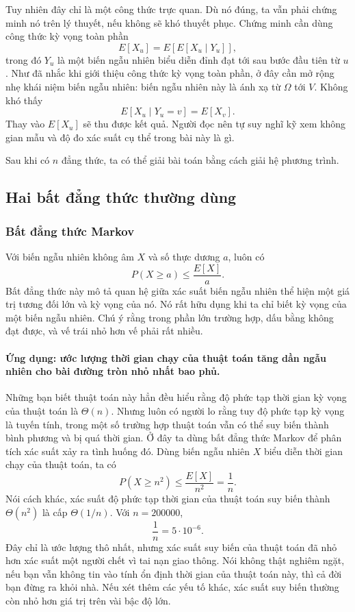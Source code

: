 \documentclass[11pt]{article}
\begin{document}
Tuy nhiên đây chỉ là một công thức trực quan. Dù nó đúng, ta vẫn phải chứng
minh nó trên lý thuyết, nếu không sẽ khó thuyết phục. Chứng minh cần dùng
công thức kỳ vọng toàn phần
\[
  E[X_u]=E[E[X_u\mid Y_u]],
\]
trong đó \(Y_u\) là một biến ngẫu nhiên biểu diễn đỉnh đạt tới sau bước đầu
tiên từ \(u\). Như đã nhắc khi giới thiệu công thức kỳ vọng toàn phần, ở đây
cần mở rộng nhẹ khái niệm biến ngẫu nhiên: biến ngẫu nhiên này là ánh xạ từ
\(\Omega\) tới \(V\). Không khó thấy
\[
  E[X_u\mid Y_u=v]=E[X_v].
\]
Thay vào \(E[X_u]\) sẽ thu được kết quả. Người đọc nên tự suy nghĩ kỹ xem
không gian mẫu và độ đo xác suất cụ thể trong bài này là gì.

Sau khi có \(n\) đẳng thức, ta có thể giải bài toán bằng cách giải hệ phương
trình.

\subsection{Hai bất đẳng thức thường dùng}

\subsubsection{Bất đẳng thức Markov}

Với biến ngẫu nhiên không âm \(X\) và số thực dương \(a\), luôn có
\[
  P(X\ge a)\le \frac{E[X]}{a}.
\]
Bất đẳng thức này mô tả quan hệ giữa xác suất biến ngẫu nhiên thể hiện một
giá trị tương đối lớn và kỳ vọng của nó. Nó rất hữu dụng khi ta chỉ biết kỳ
vọng của một biến ngẫu nhiên. Chú ý rằng trong phần lớn trường hợp, dấu bằng
không đạt được, và vế trái nhỏ hơn vế phải rất nhiều.

\paragraph{Ứng dụng: ước lượng thời gian chạy của thuật toán tăng dần ngẫu
nhiên cho bài đường tròn nhỏ nhất bao phủ.}
Những bạn biết thuật toán này hẳn đều hiểu rằng độ phức tạp thời gian kỳ
vọng của thuật toán là \(\Theta(n)\). Nhưng luôn có người lo rằng tuy độ phức
tạp kỳ vọng là tuyến tính, trong một số trường hợp thuật toán vẫn có thể suy
biến thành bình phương và bị quá thời gian. Ở đây ta dùng bất đẳng thức
Markov để phân tích xác suất xảy ra tình huống đó. Dùng biến ngẫu nhiên \(X\)
biểu diễn thời gian chạy của thuật toán, ta có
\[
  P(X\ge n^2)\le \frac{E[X]}{n^2}=\frac1n.
\]
Nói cách khác, xác suất độ phức tạp thời gian của thuật toán suy biến thành
\(\Theta(n^2)\) là cấp \(\Theta(1/n)\). Với \(n=200000\),
\[
  \frac1n=5\cdot 10^{-6}.
\]
Đây chỉ là ước lượng thô nhất, nhưng xác suất suy biến của thuật toán đã nhỏ
hơn xác suất một người chết vì tai nạn giao thông. Nói không thật nghiêm
ngặt, nếu bạn vẫn không tin vào tính ổn định thời gian của thuật toán này,
thì cả đời bạn đừng ra khỏi nhà. Nếu xét thêm các yếu tố khác, xác suất suy
biến thường còn nhỏ hơn giá trị trên vài bậc độ lớn.
\end{document}

